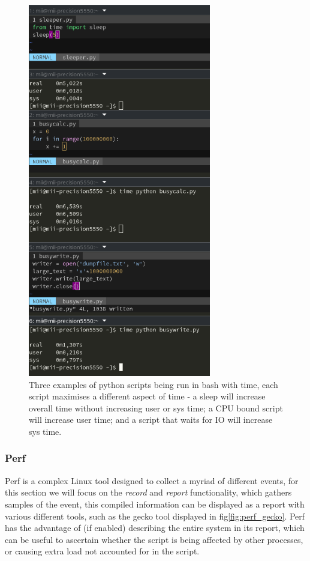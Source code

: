 \begin{figure}[H]
    \centering
    \includegraphics[width=8cm]{figures/introduction/bashtime}
    \caption{Three examples of python scripts being run in bash with time, each script maximises a different aspect of
    time - a sleep will increase overall time without increasing user or sys time; a CPU bound script will increase user
    time; and a script that waits for IO will increase sys time.}
    \label{fig:bash_time}
\end{figure}

\subsubsection{Perf}
Perf is a complex Linux tool designed to collect a myriad of different events, for this section we will focus on the
\textit{record} and \textit{report} functionality, which gathers samples of the  event, this compiled 
information can be displayed as a report with various different tools, such as the gecko tool displayed in
fig\ref{fig:perf_gecko}.
Perf has the advantage of (if enabled) describing the entire system in its report, which can be useful to ascertain
whether the script is being affected by other processes, or causing extra load not accounted for in the script.

